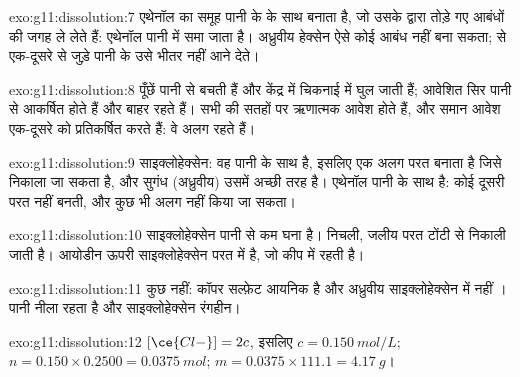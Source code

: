 \begin{solution}{exo:g11:dissolution:7}
एथेनॉल का  समूह पानी के  के साथ  बनाता है,
जो उसके द्वारा तोड़े गए आबंधों की जगह ले लेते हैं: एथेनॉल पानी में समा जाता है।
अध्रुवीय हेक्सेन ऐसे कोई आबंध नहीं बना सकता;  से एक-दूसरे से जुड़े
पानी के  उसे भीतर नहीं आने देते।
\end{solution}

\begin{solution}{exo:g11:dissolution:8}
 पूँछें पानी से बचती हैं और केंद्र में चिकनाई में घुल जाती हैं;
आवेशित सिर पानी से आकर्षित होते हैं और बाहर रहते हैं। सभी
 की सतहों पर ऋणात्मक आवेश होते हैं, और समान आवेश एक-दूसरे को
प्रतिकर्षित करते हैं: वे अलग रहते हैं।
\end{solution}

\begin{solution}{exo:g11:dissolution:9}
साइक्लोहेक्सेन: वह पानी के साथ  है, इसलिए एक अलग परत बनाता है जिसे
निकाला जा सकता है, और सुगंध (अध्रुवीय) उसमें अच्छी तरह  है।
एथेनॉल पानी के साथ  है: कोई दूसरी परत नहीं बनती, और कुछ भी
अलग नहीं किया जा सकता।
\end{solution}

\begin{solution}{exo:g11:dissolution:10}
साइक्लोहेक्सेन पानी से कम घना है। निचली, जलीय परत टोंटी से
निकाली जाती है। आयोडीन ऊपरी साइक्लोहेक्सेन परत में है, जो
कीप में रहती है।
\end{solution}

\begin{solution}{exo:g11:dissolution:11}
कुछ नहीं: कॉपर सल्फ़ेट आयनिक है और अध्रुवीय साइक्लोहेक्सेन में नहीं
। पानी नीला रहता है और साइक्लोहेक्सेन रंगहीन।
\end{solution}

\begin{solution}{exo:g11:dissolution:12}
$[\ce{Cl-}] = 2c$, इसलिए $c = \qty{0.150}{mol/L}$;
$n = 0.150 \times 0.2500 = \qty{0.0375}{mol}$;
$m = 0.0375 \times 111.1 = \qty{4.17}{g}$।
\end{solution}

